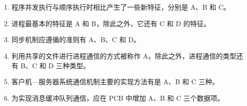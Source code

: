 \documentclass[UTF8]{ctexart}
\begin{document}
\section{}
\begin{enumerate}
	\item 程序并发执行与顺序执行时相比产生了一些新特征，分别是 A、B 和 C。
	
	\item 进程最基本的特征是 A 和 B，除此之外，它还有 C 和 D 的特征。
	
	\item 同步机制应遵循的准则有 A、B、C 和 D。
	
	\item 利用共享的文件进行进程通信的方式被称作 A，除此之外，进程通信的类型还有 B、C 和 D 三种类型。
	
	\item 客户机—服务器系统通信机制主要的实现方法有是 A、B 和 C 三种。
	
	\item 为实现消息缓冲队列通信，应在 PCB 中增加 A、B 和 C 三个数据项。
\end{enumerate}
\end{document}
